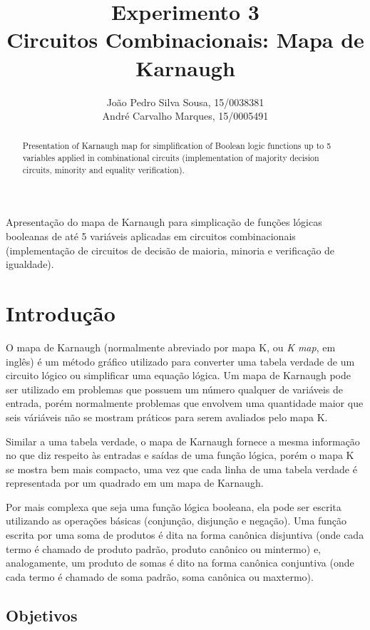 \documentclass[12pt]{article}
\title{Experimento 3\\ 
Circuitos Combinacionais: Mapa de Karnaugh}
\author{João Pedro Silva Sousa, 15/0038381\\
        André Carvalho Marques,  15/0005491
}
\begin{document}
 
\maketitle

 \begin{abstract}
   Presentation of Karnaugh map for simplification of Boolean logic functions up to 5 variables applied in combinational circuits (implementation of majority decision circuits, minority and equality verification).
 \end{abstract}
    
 \begin{resumo} 
  Apresentação do mapa de Karnaugh para simplicação de funções lógicas booleanas de até 5 variáveis aplicadas em circuitos combinacionais (implementação de circuitos de decisão de maioria, minoria e verificação de igualdade).
 \end{resumo}


\section{Introdução}
\label{sec:Introducao}

O mapa de Karnaugh (normalmente abreviado por mapa K, ou \textit{K map}, em inglês) é um método gráfico utilizado para converter uma tabela verdade de um circuito lógico ou simplificar uma equação lógica. Um mapa de Karnaugh pode ser utilizado em problemas que possuem um número qualquer de variáveis de entrada, porém normalmente problemas que envolvem uma quantidade maior que seis váriáveis não se mostram práticos para serem avaliados pelo mapa K.

Similar a uma tabela verdade, o mapa de Karnaugh fornece a mesma informação no que diz respeito às entradas e saídas de uma função lógica, porém o mapa K se mostra bem mais compacto, uma vez que cada linha de uma tabela verdade é representada por um quadrado em um mapa de Karnaugh.

Por mais complexa que seja uma função lógica booleana, ela pode ser escrita utilizando as operações básicas (conjunção, disjunção e negação). Uma função escrita por uma soma de produtos é dita na forma canônica disjuntiva (onde cada termo é chamado de produto padrão, produto canônico ou mintermo) e, analogamente, um produto de somas é dito na forma canônica conjuntiva (onde cada termo é chamado de soma padrão, soma canônica ou maxtermo).

\subsection{Objetivos}
\label{sec:Objetivos}
\end{document}
